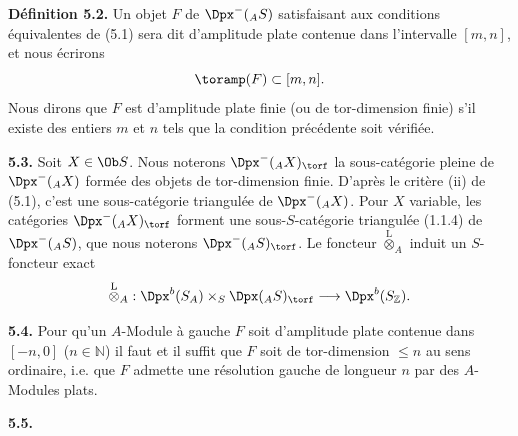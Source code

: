 \textbf{Définition 5.2.} Un objet \(F\) de \(\Dpx^-({}_A S)\) satisfaisant aux conditions équivalentes de (5.1) sera dit d'amplitude plate contenue dans l'intervalle \([m,n]\), et nous écrirons
\[
  \toramp(F)\subset[m,n].
\]
Nous dirons que \(F\) est d'amplitude plate finie (ou de tor-dimension finie) s'il existe des entiers \(m\) et \(n\) tels que la condition précédente soit vérifiée.

\textbf{5.3.} Soit \(X\in\Ob S\). Nous noterons \(\Dpx^-({}_A X)_{\torf}\) la sous-catégorie pleine de \(\Dpx^-({}_A X)\) formée des objets de tor-dimension finie. D'après le critère (ii) de (5.1), c'est une sous-catégorie triangulée de \(\Dpx^-({}_A X)\). Pour \(X\) variable, les catégories \(\Dpx^-({}_A X)_{\torf}\) forment une sous-\(S\)-catégorie triangulée (1.1.4) de \(\Dpx^-({}_A S)\), que nous noterons \(\Dpx^-({}_A S)_{\torf}\). Le foncteur \(\overset{\mathrm L}{\otimes}_A\) induit un \(S\)-foncteur exact
\[
  \overset{\mathrm L}{\otimes}_A:
  \Dpx^b(S_A)\times_S \Dpx({}_A S)_{\torf}
  \longrightarrow \Dpx^b(S_{\mathbb Z}).
\]

\textbf{5.4.} Pour qu'un \(A\)-Module à gauche \(F\) soit d'amplitude plate contenue dans \([-n,0]\) (\(n\in\mathbb N\)) il faut et il suffit que \(F\) soit de tor-dimension \(\leq n\) au sens ordinaire, i.e. que \(F\) admette une résolution gauche de longueur \(n\) par des \(A\)-Modules plats.

\textbf{5.5.}
